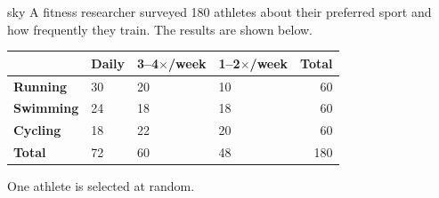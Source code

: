 \documentclass[10pt]{article}
\begin{document}
\namepartnerperiod

\vspace{0.1in}

\begin{scenariobox}[Context]{sky}
\small
A fitness researcher surveyed 180 athletes about their preferred sport and
how frequently they train. The results are shown below.

\vspace{6pt}
\renewcommand{\arraystretch}{1.4}
\begin{tabularx}{\linewidth}{@{} l X X X r @{}}
 & \textbf{Daily} & \textbf{3--4$\times$/week} & \textbf{1--2$\times$/week} & \textbf{Total} \\
\hline
\textbf{Running}  & 30 & 20 & 10 & 60 \\
\textbf{Swimming} & 24 & 18 & 18 & 60 \\
\textbf{Cycling}  & 18 & 22 & 20 & 60 \\
\hline
\textbf{Total}    & 72 & 60 & 48 & 180 \\
\end{tabularx}

\vspace{4pt}
One athlete is selected at random.
\end{scenariobox}

\vspace{0.1in}
\end{document}
